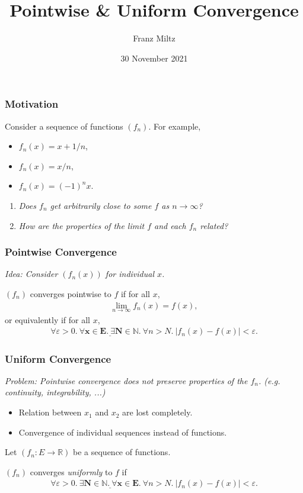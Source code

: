 \documentclass{beamer}
\title{Pointwise \& Uniform Convergence}
\author{Franz Miltz}
\date{30 November 2021}
\begin{document}
    \frame{\titlepage}
    \begin{frame}
        \frametitle{Motivation}
        Consider a sequence of functions $(f_n)$. For example,
        \begin{itemize}
            \item $f_n(x) = x + 1/n$,
            \item $f_n(x) = x/n$,
            \item $f_n(x) = (-1)^nx$.
        \end{itemize}
        \begin{enumerate}
            \item \emph{Does $f_n$ get arbitrarily close to some $f$ as $n\to\infty$?}
            \item \emph{How are the properties of the limit $f$ and each $f_n$ related?}
        \end{enumerate}
    \end{frame} 
    \begin{frame}
        \frametitle{Pointwise Convergence}
        \emph{Idea: Consider $(f_n(x))$ for individual $x$.}
        \begin{definition}
            $(f_n)$ converges pointwise to $f$ if 
            for all $x$,
            \begin{align*}
                \lim_{n\to\infty} f_n(x) = f(x),
            \end{align*}
            or equivalently if for all $x$,
            \begin{align*}
                \forall \varepsilon > 0.\:
                \underline{\mathbf{\forall x\in E.\:\exists N\in\mathbb{N}.}}\:
                \forall n>N.\:\left\vert f_n(x)-f(x) \right\vert < \varepsilon.
            \end{align*}
        \end{definition}
    \end{frame} 
    \begin{frame}
        \frametitle{Uniform Convergence}
        \emph{Problem: Pointwise convergence does not preserve properties of the $f_n$.
        (e.g. continuity, integrability, ...)}
        \begin{itemize}
            \item Relation between $x_1$ and $x_2$ are lost completely.
            \item Convergence of individual sequences instead of functions.
        \end{itemize}
        Let $(f_n:E\to\mathbb{R})$ be a sequence of functions.
        \begin{definition}
            $(f_n)$ converges \emph{uniformly} to $f$ if
            \begin{align*}
                \forall \varepsilon >0.\: 
                \underline{\mathbf{\exists N\in\mathbb{N}.\:\forall x\in E.}}\:
                \forall n > N.\: \left\vert f_n(x)-f(x) \right\vert < \varepsilon.
            \end{align*}
        \end{definition}
    \end{frame}
\end{document}
